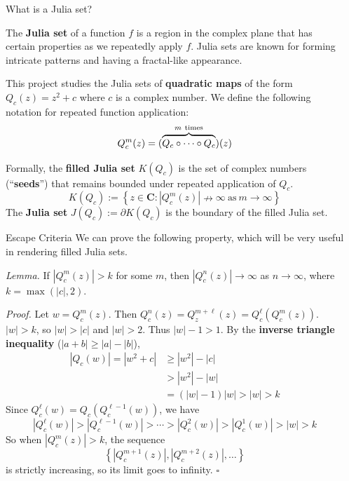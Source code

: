 \documentclass[final]{beamer}
\newlength{\sepwidth}
\newlength{\colwidth}
\newcommand{\separatorcolumn}{\begin{column}{\sepwidth}\end{column}}
\newcommand{\setbold}{\mathbf}
\newcommand{\CC}{\setbold{C}}
\begin{document}
\begin{frame}[t]
\begin{columns}[t]
\separatorcolumn

\begin{column}{\colwidth}

	\begin{block}{What is a Julia set?}

		The \textbf{Julia set} of a function $f$ is a
		region in the complex plane that has certain
		properties as we repeatedly apply $f$.
		Julia sets are known for forming intricate
		patterns and having a fractal-like appearance.

		This project studies the Julia sets of
		\textbf{quadratic maps} of the form
		$Q_c(z) = z^2 + c$ where $c$ is a complex number.
		We define the following notation for repeated function application: \[
			Q_c^{m}(z) = (\overbrace{\vphantom{(}Q_c \circ \cdots \circ Q_c}^{m\ \text{times}})(z)
		\]

		Formally, the \textbf{filled Julia set} $K(Q_c)$
		is the set of complex numbers (``\textbf{seeds}'')
		that remains bounded
		under repeated application of $Q_c$. \[
			K(Q_c) := \left\{ z \in \CC : |Q_c^{m}(z)| \nrightarrow \infty\ \text{as}\ m \rightarrow \infty \right\}
		\]
		The \textbf{Julia set} $J(Q_c) := \partial{} K(Q_c)$ is the boundary
		of the filled Julia set.

	\end{block}

	\begin{alertblock}{Escape Criteria}
		We can prove the following property, which will
		be very useful in rendering filled Julia sets.

		\textit{Lemma.}
		If $|Q_c^{m}(z)| > k$
		for some $m$, then $|Q_c^{n}(z)| \rightarrow \infty$ as $n \rightarrow \infty$,
		where $k = \max(|c|, 2)$.

		\textit{Proof.}
		Let $w = Q_c^{m}(z)$. Then $Q_c^{n}(z) = Q_z^{m + \ell}(z) = Q_c^{\ell}(Q_c^{m}(z))$.
		$|w| > k$, so $|w| > |c|$ and $|w| > 2$. Thus $|w| - 1 > 1$.
		By the \textbf{inverse triangle inequality} ($|a + b| \ge |a| - |b|$),
		\begin{align*}
			|Q_c(w)| = |w^2 + c| &\ge |w^2| - |c| \\
								 &> |w^2| - |w| \\
								 &= (|w| - 1)|w| > |w| > k
		\end{align*}
		Since $Q_c^{\ell}(w) = Q_c(Q_c^{\ell - 1}(w))$, we have \[
			|Q_c^{\ell}(w)| > |Q_c^{\ell - 1}(w)| > \cdots > |Q_c^{2}(w)| >|Q_c^{1}(w)| > |w| > k
		\]
		So when $|Q_c^{m}(z)| > k$, the sequence \[
			\left\{ |Q_c^{m + 1}(z)|, |Q_c^{m + 2}(z)|, \ldots \right\}
		\] is strictly increasing, so its limit goes to infinity. \hfill $\square$




\end{alertblock}
\end{column}
\end{columns}
\end{frame}
\end{document}
